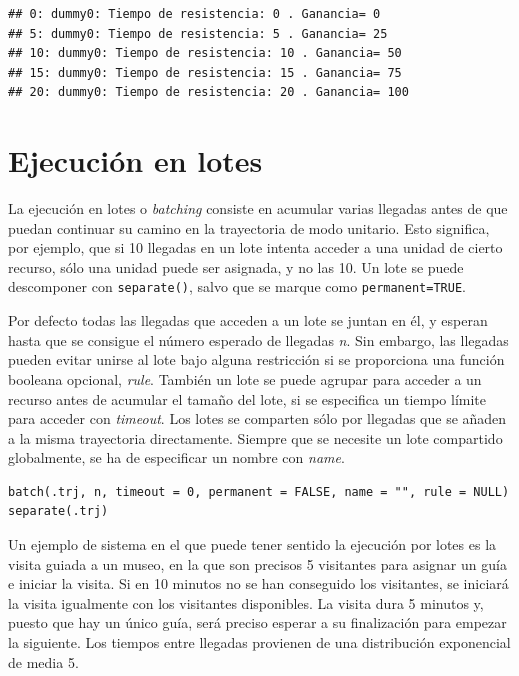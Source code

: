 \documentclass[
]{book}
\theoremstyle{definition}
\theoremstyle{definition}
\theoremstyle{definition}
\theoremstyle{definition}
\theoremstyle{remark}
\begin{document}
\begin{verbatim}
## 0: dummy0: Tiempo de resistencia: 0 . Ganancia= 0
## 5: dummy0: Tiempo de resistencia: 5 . Ganancia= 25
## 10: dummy0: Tiempo de resistencia: 10 . Ganancia= 50
## 15: dummy0: Tiempo de resistencia: 15 . Ganancia= 75
## 20: dummy0: Tiempo de resistencia: 20 . Ganancia= 100
\end{verbatim}

\hypertarget{ejecuciuxf3n-en-lotes}{%
\section{Ejecución en lotes}\label{ejecuciuxf3n-en-lotes}}

La ejecución en lotes o \emph{batching} consiste en acumular varias llegadas antes de que puedan continuar su camino en la trayectoria de modo unitario. Esto significa, por ejemplo, que si 10 llegadas en un lote intenta acceder a una unidad de cierto recurso, sólo una unidad puede ser asignada, y no las 10. Un lote se puede descomponer con \texttt{separate()}, salvo que se marque como \texttt{permanent=TRUE}.

Por defecto todas las llegadas que acceden a un lote se juntan en él, y esperan hasta que se consigue el número esperado de llegadas \emph{n}. Sin embargo, las llegadas pueden evitar unirse al lote bajo alguna restricción si se proporciona una función booleana opcional, \emph{rule}. También un lote se puede agrupar para acceder a un recurso antes de acumular el tamaño del lote, si se especifica un tiempo límite para acceder con \emph{timeout}. Los lotes se comparten sólo por llegadas que se añaden a la misma trayectoria directamente. Siempre que se necesite un lote compartido globalmente, se ha de especificar un nombre con \emph{name}.

\begin{verbatim}
batch(.trj, n, timeout = 0, permanent = FALSE, name = "", rule = NULL)
separate(.trj)
\end{verbatim}

Un ejemplo de sistema en el que puede tener sentido la ejecución por lotes es la visita guiada a un museo, en la que son precisos 5 visitantes para asignar un guía e iniciar la visita. Si en 10 minutos no se han conseguido los visitantes, se iniciará la visita igualmente con los visitantes disponibles. La visita dura 5 minutos y, puesto que hay un único guía, será preciso esperar a su finalización para empezar la siguiente. Los tiempos entre llegadas provienen de una distribución exponencial de media 5.
\end{document}
